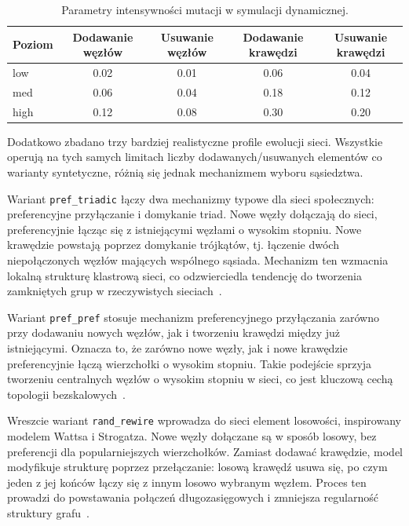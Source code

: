 \begin{table}[H]
    \centering
    \caption{Parametry intensywności mutacji w symulacji dynamicznej.}
    \label{tab:dyn-mutation-levels}
    \begin{tabular}{lcccc}
        \toprule
        \textbf{Poziom} & \textbf{Dodawanie węzłów} & \textbf{Usuwanie węzłów} & \textbf{Dodawanie krawędzi} & \textbf{Usuwanie krawędzi} \\
        \midrule
        low             & 0.02                      & 0.01                     & 0.06                        & 0.04                       \\
        med             & 0.06                      & 0.04                     & 0.18                        & 0.12                       \\
        high            & 0.12                      & 0.08                     & 0.30                        & 0.20                       \\
            \bottomrule
    \end{tabular}
\end{table}


Dodatkowo zbadano trzy bardziej realistyczne profile ewolucji sieci. Wszystkie operują na tych samych limitach liczby dodawanych/usuwanych elementów co warianty syntetyczne, różnią się jednak mechanizmem wyboru sąsiedztwa.

Wariant \texttt{pref\_triadic} łączy dwa mechanizmy typowe dla sieci społecznych: preferencyjne przyłączanie i domykanie triad. Nowe węzły dołączają do sieci, preferencyjnie łącząc się z istniejącymi węzłami o wysokim stopniu. Nowe krawędzie powstają poprzez domykanie trójkątów, tj. łączenie dwóch niepołączonych węzłów mających wspólnego sąsiada. Mechanizm ten wzmacnia lokalną strukturę klastrową sieci, co odzwierciedla tendencję do tworzenia zamkniętych grup w rzeczywistych sieciach~\cite{albert2002statistical,kamola2016dynamika}.

Wariant \texttt{pref\_pref} stosuje mechanizm preferencyjnego przyłączania zarówno przy dodawaniu nowych węzłów, jak i tworzeniu krawędzi między już istniejącymi. Oznacza to, że zarówno nowe węzły, jak i nowe krawędzie preferencyjnie łączą wierzchołki o wysokim stopniu. Takie podejście sprzyja tworzeniu centralnych węzłów o wysokim stopniu w sieci, co jest kluczową cechą topologii bezskalowych~\cite{albert2002statistical}.

Wreszcie wariant \texttt{rand\_rewire} wprowadza do sieci element losowości, inspirowany modelem Wattsa i Strogatza. Nowe węzły dołączane są w sposób losowy, bez preferencji dla popularniejszych wierzchołków. Zamiast dodawać krawędzie, model modyfikuje strukturę poprzez przełączanie: losową krawędź usuwa się, po czym jeden z jej końców łączy się z innym losowo wybranym węzłem. Proces ten prowadzi do powstawania połączeń długozasięgowych i zmniejsza regularność struktury grafu~\cite{watts1998collective}.



